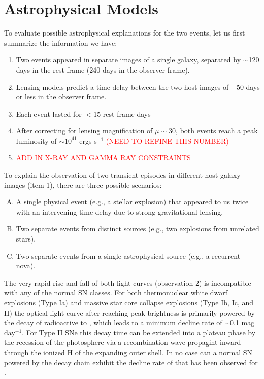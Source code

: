 \section{Astrophysical Models}

To evaluate possible astrophysical explanations for the two \spock
events, let us first summarize the information we have:

\begin{enumerate}
\item{Two events appeared in separate images of a single galaxy,
  separated by $\sim$120 days in the rest frame (240 days in the
  observer frame). \label{itm:TwoEvents}}
\item{Lensing models predict a time delay between the two host images
  of $\pm50$ days or less in the observer frame.}
\item{Each event lasted for $<$15 rest-frame days\label{itm:FastLC}}
\item{After correcting for lensing magnification of $\mu\sim30$, both
  events reach a peak luminosity of $\sim10^{41}$ ergs s$^{-1}$
  \textcolor{red}{(NEED TO REFINE THIS NUMBER)}}
\item{\textcolor{red}{ADD IN X-RAY AND GAMMA RAY CONSTRAINTS}}
\end{enumerate}

To explain the observation of two transient episodes in different host
galaxy images (item 1), there are three possible
scenarios:

\begin{enumerate}[(A)]
\item{A single physical event (e.g., a stellar explosion) that
  appeared to us twice with an intervening time delay due to strong
  gravitational lensing.}
\item{Two separate events from distinct sources (e.g., two explosions
  from unrelated stars).}
\item{Two separate events from a single astrophysical source (e.g., a
  recurrent nova).}
\end{enumerate}

The very rapid rise and fall of both light curves (observation 2)
is incompatible with any of the normal SN classes.  For both
thermonuclear white dwarf explosions (Type Ia) and massive star core
collapse explosions (Type Ib, Ic, and II) the optical light curve
after reaching peak brightness is primarily powered by the decay of
radioactive \NiFiftySix to \CoFiftySix, which leads to a minimum
decline rate of $\sim$0.1 mag day$^{-1}$.  For Type II SNe this decay
time can be extended into a plateau phase by the recession of the
photosphere via a recombination wave propagint inward through the
ionized H of the expanding outer shell.  In no case can a normal SN
powered by the \NiFiftySix decay chain exhibit the decline rate of
 that has
been observed for \spock.

